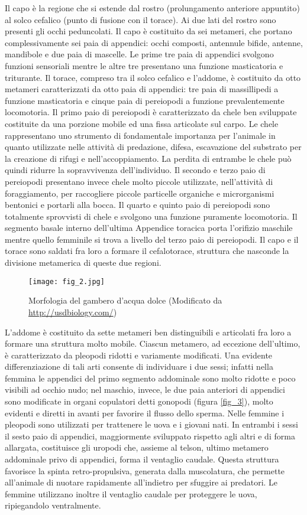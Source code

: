 \documentclass[11pt,a4paper,italian,twoside,openany]{memoir}
\begin{document}
Il capo è la regione che si estende dal rostro (prolungamento anteriore appuntito) al solco cefalico (punto di fusione con il torace). Ai due lati del rostro sono presenti gli occhi peduncolati. Il capo è costituito da sei metameri, che portano complessivamente sei paia di appendici: occhi composti, antennule bifide, antenne, mandibole e due paia di mascelle. Le prime tre paia di appendici svolgono funzioni sensoriali mentre le altre tre presentano una funzione masticatoria e triturante. Il torace, compreso tra il solco cefalico e l'addome, è costituito da otto metameri caratterizzati da otto paia di appendici: tre paia di massillipedi a funzione masticatoria e cinque paia di pereiopodi a funzione prevalentemente locomotoria. Il primo paio di pereiopodi è caratterizzato da chele ben sviluppate costituite da una porzione mobile ed una fissa articolate sul carpo. Le chele rappresentano uno strumento di fondamentale importanza per l'animale in quanto utilizzate nelle attività di predazione, difesa, escavazione del substrato per la creazione di rifugi e nell'accoppiamento. La perdita di entrambe le chele può quindi ridurre la sopravvivenza dell'individuo. Il secondo e terzo paio di pereiopodi presentano invece chele molto piccole utilizzate, nell'attività di foraggiamento, per raccogliere piccole particelle organiche e microrganismi bentonici e portarli alla bocca. Il quarto e quinto paio di pereiopodi sono totalmente sprovvisti di chele e svolgono una funzione puramente locomotoria. Il segmento basale interno dell'ultima Appendice toracica porta l'orifizio maschile mentre quello femminile si trova a livello del terzo paio di pereiopodi. Il capo e il torace sono saldati fra loro a formare il cefalotorace, struttura che nasconde la divisione metamerica di queste due regioni. 
\newpage
\begin{figure}[H]
  \centering
  \texttt{[image: fig\_2.jpg]}
  \caption{Morfologia del gambero d'acqua dolce (Modificato da \url{http://usdbiology.com/})}
  \label{fig_2}
\end{figure}

L'addome è costituito da sette metameri ben distinguibili e articolati fra loro a formare una struttura molto mobile. Ciascun metamero, ad eccezione dell'ultimo, è caratterizzato da pleopodi ridotti e variamente modificati. Una evidente differenziazione di tali arti consente di individuare i due sessi; infatti nella femmina le appendici del primo segmento addominale sono molto ridotte e poco visibili ad occhio nudo; nel maschio, invece, le due paia anteriori di appendici sono modificate in organi copulatori detti gonopodi (figura \ref{fig_3}), molto evidenti e diretti in avanti per favorire il flusso dello sperma. Nelle femmine i pleopodi sono utilizzati per trattenere le uova e i giovani nati. In entrambi i sessi il sesto paio di appendici, maggiormente sviluppato rispetto agli altri e di forma allargata, costituisce gli uropodi che, assieme al telson, ultimo metamero addominale privo di appendici, forma il ventaglio caudale. Questa struttura favorisce la spinta retro-propulsiva, generata dalla muscolatura, che permette all'animale di nuotare rapidamente all'indietro per sfuggire ai predatori. Le femmine utilizzano inoltre il ventaglio caudale per proteggere le uova, ripiegandolo ventralmente. 
\end{document}
